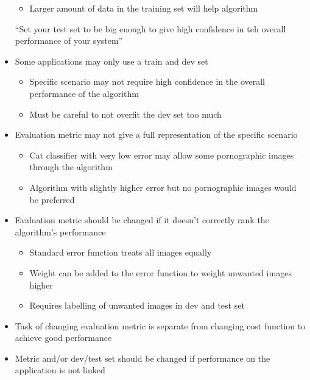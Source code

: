 \documentclass[12pt, letterpaper]{article}
\begin{document}
\begin{itemize}
\begin{itemize}
            \item Larger amount of data in the training set will help algorithm 
        \end{itemize}
        \vspace{5mm}
        \begin{center}
            ``Set your test set to be big enough to give high confidence in teh overall performance of your system''
        \end{center}
        \item Some applications may only use a train and dev set
        \begin{itemize}
            \item Specific scenario may not require high confidence in the overall performance of the algorithm 
            \item Must be careful to not overfit the dev set too much
        \end{itemize}
        \item Evaluation metric may not give a full representation of the specific scenario
        \begin{itemize}
            \item Cat classifier with very low error may allow some pornographic images through the algorithm
            \item Algorithm with slightly higher error but no pornographic images would be preferred
        \end{itemize}
        \item Evaluation metric should be changed if it doesn't correctly rank the algorithm's performance
        \begin{itemize}
            \item Standard error function treats all images equally 
            \item Weight can be added to the error function to weight unwanted images higher
            \item Requires labelling of unwanted images in dev and test set
        \end{itemize}
        \item Task of changing evaluation metric is separate from changing cost function to achieve good performance
        \item Metric and/or dev/test set should be changed if performance on the application is not linked
    \end{itemize}
\end{document}
